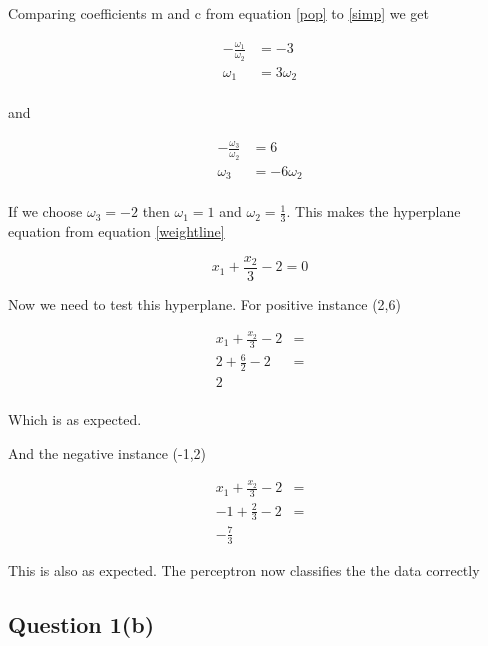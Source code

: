 \documentclass[10pt,a4paper]{article}
\begin{document}
Comparing coefficients m and c from equation \ref{pop} to \ref{simp} we get

\begin{equation}
\begin{split}
-\frac{\omega_1}{\omega_2} &= -3 \\
\omega_1 &= 3\omega_2\\ 
\end{split}
\end{equation}

and

\begin{equation}
\begin{split}
-\frac{\omega_3}{\omega_2} &= 6\\
\omega_3 &= -6\omega_2\\ 
\end{split}
\end{equation}

If we choose $\omega_3 = -2$ then $\omega_1=1$ and $\omega_2 = \frac{1}{3}$. This makes the hyperplane equation from equation \ref{weightline}

\begin{equation}
x_1 + \frac{x_2}{3} -2 = 0
\end{equation}

Now we need to test this hyperplane. For positive instance (2,6)

\begin{equation}
\begin{split}
x_1 + \frac{x_2}{3} - 2 &= \\
2 + \frac{6}{2} - 2 &= \\
2&\\
\end{split}
\end{equation}

Which is as expected.

And the negative instance (-1,2)

\begin{equation}
\begin{split}
x_1 + \frac{x_2}{3} - 2 &= \\
-1 + \frac{2}{3} -2 & = \\
-\frac{7}{3}
\end{split}
\end{equation}

This is also as expected. The perceptron now classifies the the data correctly
\subsection{Question 1(b)}
\end{document}
